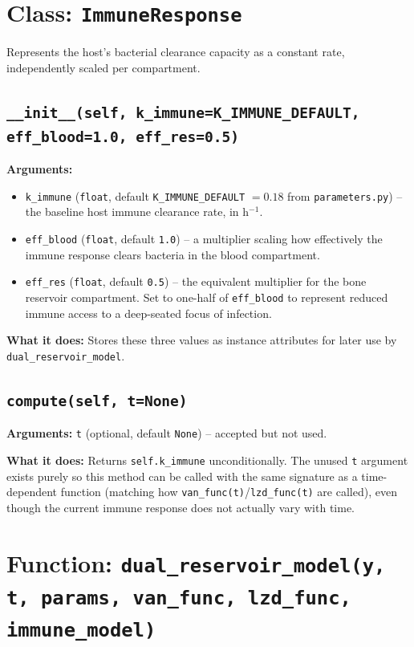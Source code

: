 \documentclass[11pt]{article}
\begin{document}
\section{Class: \texttt{ImmuneResponse}}

Represents the host's bacterial clearance capacity as a constant rate,
independently scaled per compartment.

\subsection{\texttt{\_\_init\_\_(self, k\_immune=K\_IMMUNE\_DEFAULT, eff\_blood=1.0, eff\_res=0.5)}}

\textbf{Arguments:}
\begin{itemize}
\item \texttt{k\_immune} (\texttt{float}, default
\texttt{K\_IMMUNE\_DEFAULT} $=0.18$ from \texttt{parameters.py}) -- the
baseline host immune clearance rate, in h$^{-1}$.
\item \texttt{eff\_blood} (\texttt{float}, default \texttt{1.0}) -- a
multiplier scaling how effectively the immune response clears bacteria in
the blood compartment.
\item \texttt{eff\_res} (\texttt{float}, default \texttt{0.5}) -- the
equivalent multiplier for the bone reservoir compartment. Set to one-half
of \texttt{eff\_blood} to represent reduced immune access to a deep-seated
focus of infection.
\end{itemize}

\textbf{What it does:} Stores these three values as instance attributes for
later use by \texttt{dual\_reservoir\_model}.

\subsection{\texttt{compute(self, t=None)}}

\textbf{Arguments:} \texttt{t} (optional, default \texttt{None}) -- accepted
but not used.

\textbf{What it does:} Returns \texttt{self.k\_immune} unconditionally. The
unused \texttt{t} argument exists purely so this method can be called with
the same signature as a time-dependent function (matching how
\texttt{van\_func(t)}/\texttt{lzd\_func(t)} are called), even though the
current immune response does not actually vary with time.

\section{Function: \texttt{dual\_reservoir\_model(y, t, params, van\_func, lzd\_func, immune\_model)}}
\end{document}
